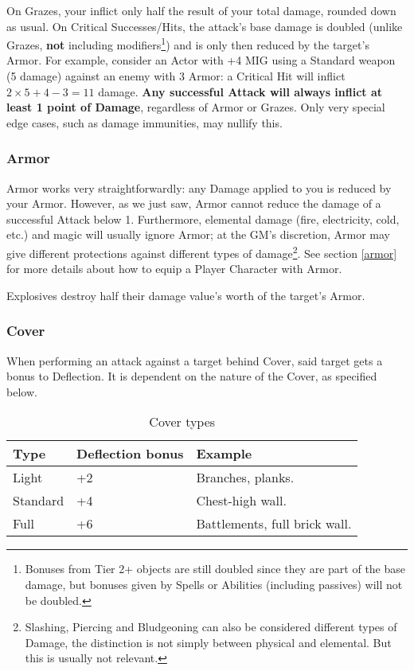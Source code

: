 On Grazes, your inflict only half the result of your total damage, rounded down as usual. On Critical Successes/Hits, the attack's base damage is doubled (unlike Grazes, \textbf{not} including modifiers\footnote{Bonuses from Tier 2+ objects are still doubled since they are part of the base damage, but bonuses given by Spells or Abilities (including passives) will not be doubled.}) and is only then reduced by the target's Armor. For example, consider an Actor with +4 MIG using a Standard weapon (5 damage) against an enemy with 3 Armor: a Critical Hit will inflict $2\times5+4-3 = 11$ damage. \textbf{Any successful Attack will always inflict at least 1 point of Damage}, regardless of Armor or Grazes. Only very special edge cases, such as damage immunities, may nullify this.

\subsubsection{Armor} 

Armor works very straightforwardly: any Damage applied to you is reduced by your Armor. However, as we just saw, Armor cannot reduce the damage of a successful Attack below 1. Furthermore, elemental damage (fire, electricity, cold, etc.) and magic will usually ignore Armor; at the GM's discretion, Armor may give different protections against different types of damage\footnote{Slashing, Piercing and Bludgeoning can also be considered different types of Damage, the distinction is not simply between physical and elemental. But this is usually not relevant.}. See section \ref{armor} for more details about how to equip a Player Character with Armor.

Explosives destroy half their damage value's worth of the target's Armor.

\subsubsection{Cover} 

When performing an attack against a target behind Cover, said target gets a bonus to Deflection. It is dependent on the nature of the Cover, as specified below.

\begin{table}[h!tbp]
	\begin{center}
		\begin{tabular}{p{1.5cm}p{2cm}p{4cm}} \toprule
			
			\textbf{Type} & \textbf{Deflection bonus} & \textbf{Example} \\ \midrule
			
			Light & +2 & Branches, planks. \\
			Standard & +4 & Chest-high wall. \\
			Full & +6 & Battlements, full brick wall.\\

			\bottomrule
		\end{tabular}
	\end{center}
	\caption{Cover types}
	\label{cover_types}
\end{table}

